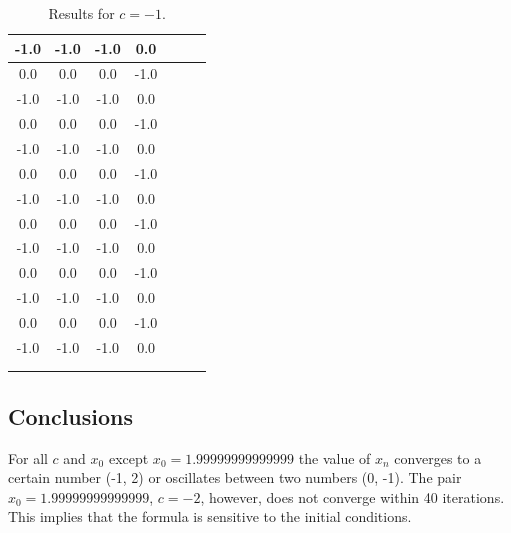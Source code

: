 \documentclass[a4paper, 12pt]{article}
\begin{document}
\begin{longtable}[H]{ccccccc}
-1.0 & -1.0 & -1.0 & 0.0 \\ \midrule
0.0  & 0.0  & 0.0 & -1.0 \\ \midrule
-1.0 & -1.0 & -1.0 & 0.0 \\ \midrule
0.0  & 0.0  & 0.0 & -1.0 \\ \midrule
-1.0 & -1.0 & -1.0 & 0.0 \\ \midrule
0.0  & 0.0  & 0.0 & -1.0 \\ \midrule
-1.0 & -1.0 & -1.0 & 0.0 \\ \midrule
0.0  & 0.0  & 0.0 & -1.0 \\ \midrule
-1.0 & -1.0 & -1.0 & 0.0 \\ \midrule
0.0  & 0.0  & 0.0 & -1.0 \\ \midrule
-1.0 & -1.0 & -1.0 & 0.0 \\ \midrule
0.0  & 0.0  & 0.0 & -1.0 \\ \midrule
-1.0 & -1.0 & -1.0 & 0.0 \\ \bottomrule
\caption{Results for $c = -1$.} \\
\label{tab:recursive_c1} \\
\end{longtable}

\subsection{Conclusions}
For all $c$ and $x_0$ except $x_0 = 1.99999999999999$ the value of $x_n$
converges to a certain number (-1, 2) or oscillates between two numbers (0, -1).
The pair $x_0 = 1.99999999999999$, $c = -2$, however, does not converge within
40 iterations. This implies that the formula is sensitive to the initial
conditions.
\end{document}
